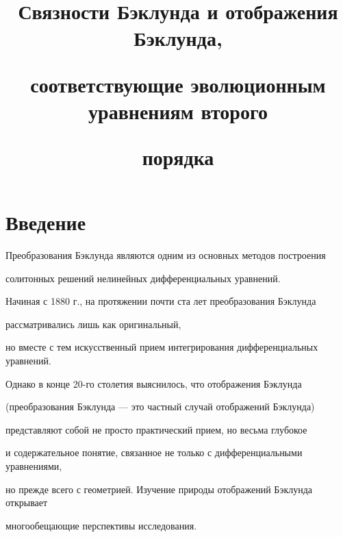 

\title{Связности Бэклунда и отображения Бэклунда,


соответствующие эволюционным уравнениям второго


порядка}





\date{}




\pagestyle{plain} %







\maketitle


\label{begin}





 


\section{Введение}





Преобразования Бэклунда являются одним из основных методов построения 


солитонных решений нелинейных дифференциальных уравнений. 


Начиная с 1880 г., на протяжении почти ста лет преобразования Бэклунда 


рассматривались лишь как оригинальный,


но вместе с тем искусственный прием интегрирования дифференциальных уравнений.


Однако в конце 20-го столетия выяснилось, что отображения Бэклунда


(преобразования Бэклунда --- это частный случай отображений Бэклунда)


представляют собой не просто практический прием, но весьма глубокое


и содержательное понятие, связанное не только с дифференциальными уравнениями,


но прежде всего с геометрией. Изучение природы отображений Бэклунда открывает


многообещающие перспективы исследования.





